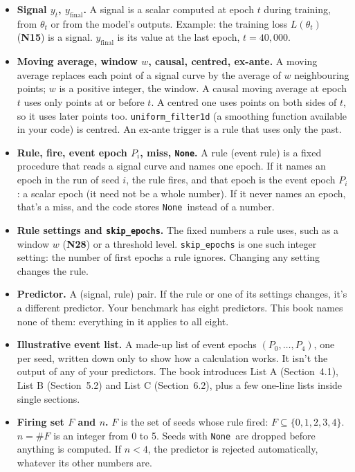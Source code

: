 \documentclass[11pt,a4paper,oneside,openany]{report}
\newcommand{\yfinal}{y_{\mathrm{final}}}
\newcommand{\None}{\texttt{None}}
\newcommand{\code}[1]{\texttt{#1}}
\newcommand{\gl}[1]{\textbf{#1}}   %
\newenvironment{glist}{\begin{itemize}\setlength{\itemsep}{2pt}\setlength{\parskip}{1pt}}{\end{itemize}}
\begin{document}
\begin{glist}
\item[\gl{N27}] \textbf{Signal $y_t$, $\yfinal$.} A signal is a scalar computed at epoch $t$ during training, from $\theta_t$ or from the model's outputs. Example: the training loss $L(\theta_t)$ (\gl{N15}) is a signal. $\yfinal$ is its value at the last epoch, $t = 40{,}000$.
\item[\gl{N28}] \textbf{Moving average, window $w$, causal, centred, ex-ante.} A moving average replaces each point of a signal curve by the average of $w$ neighbouring points; $w$ is a positive integer, the window. A causal moving average at epoch $t$ uses only points at or before $t$. A centred one uses points on both sides of $t$, so it uses later points too. \code{uniform\_\allowbreak{}filter1d} (a smoothing function available in your code) is centred. An ex-ante trigger is a rule that uses only the past.
\item[\gl{N29}] \textbf{Rule, fire, event epoch $P_i$, miss, \None.} A rule (event rule) is a fixed procedure that reads a signal curve and names one epoch. If it names an epoch in the run of seed $i$, the rule fires, and that epoch is the event epoch $P_i$: a scalar epoch (it need not be a whole number). If it never names an epoch, that's a miss, and the code stores \None\ instead of a number.
\item[\gl{N30}] \textbf{Rule settings and \code{skip\_\allowbreak{}epochs}.} The fixed numbers a rule uses, such as a window $w$ (\gl{N28}) or a threshold level. \code{skip\_\allowbreak{}epochs} is one such integer setting: the number of first epochs a rule ignores. Changing any setting changes the rule.
\item[\gl{N31}] \textbf{Predictor.} A (signal, rule) pair. If the rule or one of its settings changes, it's a different predictor. Your benchmark has eight predictors. This book names none of them: everything in it applies to all eight.
\item[\gl{N32}] \textbf{Illustrative event list.} A made-up list of event epochs $(P_0, \ldots, P_4)$, one per seed, written down only to show how a calculation works. It isn't the output of any of your predictors. The book introduces List A (Section~4.1), List B (Section~5.2) and List C (Section~6.2), plus a few one-line lists inside single sections.
\item[\gl{N33}] \textbf{Firing set $F$ and $n$.} $F$ is the set of seeds whose rule fired: $F \subseteq \{0, 1, 2, 3, 4\}$. $n = \#F$ is an integer from 0 to 5. Seeds with \None\ are dropped before anything is computed. If $n < 4$, the predictor is rejected automatically, whatever its other numbers are.

\end{glist}
\end{document}

